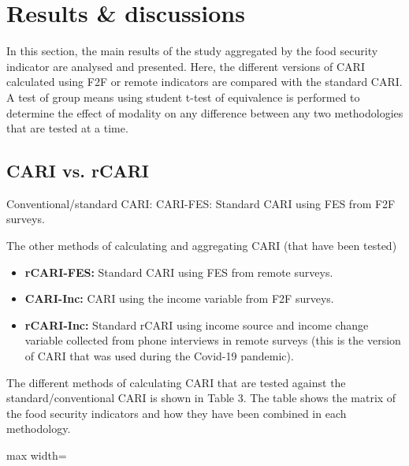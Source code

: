 \documentclass[11pt,harvard]{article}
\begin{document}
	\pagebreak
	
	\section{Results \& discussions}
	
	In this section, the main results of the study aggregated by the food security indicator are analysed and presented. Here, the different versions of CARI calculated using F2F or remote indicators are compared with the standard CARI. A test of group means using student t-test of equivalence is performed to determine the effect of modality on any difference between any two methodologies that are tested at a time. 
	
	\subsection{CARI vs. rCARI}
	
	Conventional/standard CARI:  CARI-FES: Standard CARI using FES from F2F surveys.
	
	The other methods of calculating and aggregating CARI (that have been tested)
	\begin{itemize}[label=--, left=1.5em]
		\item[1.] \textbf{rCARI-FES:} Standard CARI using FES from remote surveys.
		\item[2.] \textbf{CARI-Inc:} CARI using the income variable from F2F surveys.
		\item[3.] \textbf{rCARI-Inc:} Standard rCARI using income source and income change variable collected from phone interviews in remote surveys (this is the version of CARI that was used during the Covid-19 pandemic).
	\end{itemize}
	
	The different methods of calculating CARI that are tested against the standard/conventional CARI is shown in Table 3. The table shows the matrix of the food security indicators and how they have been combined in each methodology.
	
		\begin{table}[htbp]
		\centering
		\begin{adjustbox} {max width=\textwidth}
			\begin{threeparttable}
				\caption{Matrix of the different aggregation methods and the indicators used for each methodology}
				\scriptsize
				 
				\label{tab:Aggregation_Table}
			\end{threeparttable}
		\end{adjustbox}
	\end{table}
		
\end{document}
